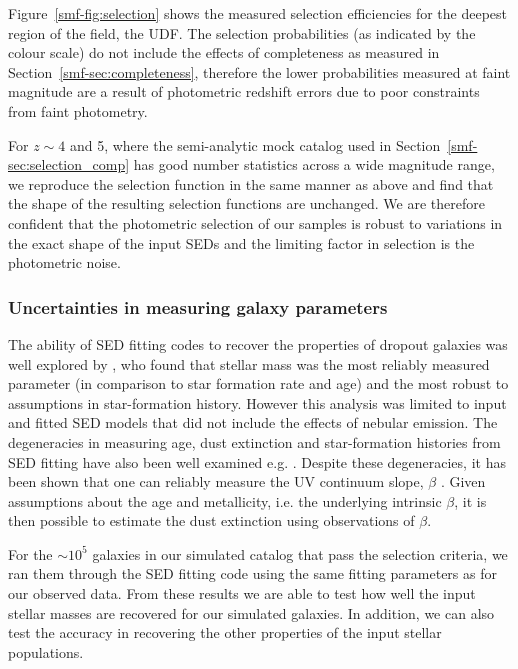 Figure~\ref{smf-fig:selection} shows the measured selection efficiencies for  the deepest region of the field, the UDF. The selection probabilities (as indicated by the colour scale) do not include the effects of completeness as measured in Section~\ref{smf-sec:completeness}, therefore the lower probabilities measured at faint magnitude are a result of photometric redshift errors due to poor constraints from faint photometry.

For $z\sim 4$ and 5, where the semi-analytic mock catalog used in Section~\ref{smf-sec:selection_comp} has good number statistics across a wide magnitude range, we reproduce the selection function in the same manner as above and find that the shape of the resulting selection functions are unchanged. We are therefore confident that the photometric selection of our samples is robust to variations in the exact shape of the input SEDs and the limiting factor in selection is the photometric noise.

\subsubsection{Uncertainties in measuring galaxy parameters}
The ability of SED fitting codes to recover the properties of dropout galaxies was well explored by \citet{2010ApJ...725.1644L}, who found that stellar mass was the most reliably measured parameter (in comparison to star formation rate and age) and the most robust to assumptions in star-formation history. However this analysis was limited to input and fitted SED models that did not include the effects of nebular emission. The degeneracies in measuring age, dust extinction and star-formation histories from SED fitting have also been well examined e.g. \citet{2010A&A...515A..73S}. Despite these degeneracies, it has been shown that one can reliably measure the UV continuum slope, $\beta$ \citep{2012ApJ...756..164F,2013MNRAS.429.2456R}. Given assumptions about the age and metallicity, i.e. the underlying intrinsic $\beta$, it is then possible to estimate the dust extinction using observations of $\beta$.

For the $\sim 10^5$ galaxies in our simulated catalog that pass the selection criteria, we ran them through the SED fitting code using the same fitting parameters as for our observed data. From these results we are able to test how well the input stellar masses are recovered for our simulated galaxies. In addition, we can also test the accuracy in recovering the other properties of the input stellar populations.

